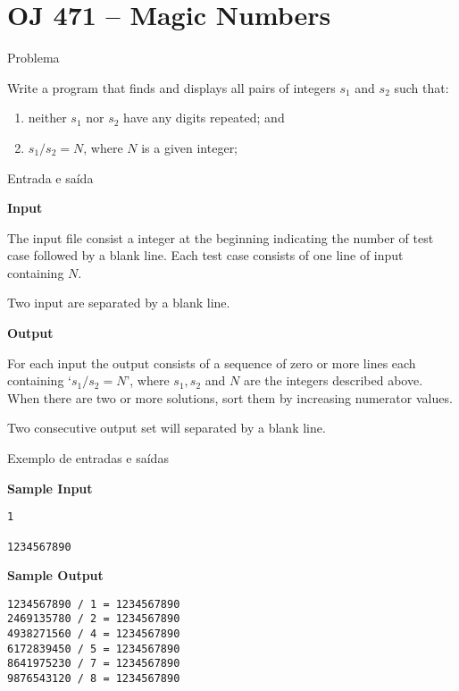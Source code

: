 \section{OJ 471 -- Magic Numbers}

\begin{frame}[fragile]{Problema}

Write a program that finds and displays all pairs of integers $s_1$ and $s_2$ such that:

\begin{enumerate}
    \item neither $s_1$ nor $s_2$ have any digits repeated; and
    \item $s_1/s_2 = N$, where $N$ is a given integer;
\end{enumerate}

\end{frame}

\begin{frame}[fragile]{Entrada e saída}

\textbf{Input}

The input file consist a integer at the beginning indicating the number of test case followed by a 
blank line. Each test case consists of one line of input containing $N$.

Two input are separated by a blank line.

\textbf{Output}

For each input the output consists of a sequence of zero or more lines each containing ‘$s_1 / 
s_2 = N$’, where $s_1, s_2$ and $N$ are the integers described above. When there are two or more 
solutions, sort them by increasing numerator values.

Two consecutive output set will separated by a blank line.

\end{frame}


\begin{frame}[fragile]{Exemplo de entradas e saídas}

\begin{minipage}[t]{0.45\textwidth}
\textbf{Sample Input}
\begin{verbatim}
1

1234567890
\end{verbatim}
\end{minipage}
\begin{minipage}[t]{0.5\textwidth}
\textbf{Sample Output}
\begin{verbatim}
1234567890 / 1 = 1234567890
2469135780 / 2 = 1234567890
4938271560 / 4 = 1234567890
6172839450 / 5 = 1234567890
8641975230 / 7 = 1234567890
9876543120 / 8 = 1234567890
\end{verbatim}
\end{minipage}
\end{frame}

